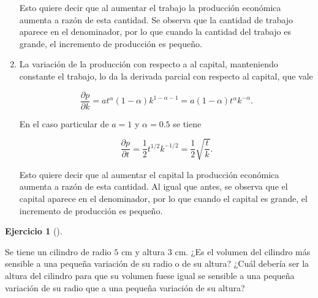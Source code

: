 \documentclass[
  a4paper,
]{scrreport}
\theoremstyle{definition}
\newtheorem{exercise}{Ejercicio}[chapter]
\theoremstyle{remark}
\begin{document}
\begin{tcolorbox}
\begin{enumerate}
  Esto quiere decir que al aumentar el trabajo la producción económica
  aumenta a razón de esta cantidad. Se observa que la cantidad de
  trabajo aparece en el denominador, por lo que cuando la cantidad del
  trabajo es grande, el incremento de producción es pequeño.
\item
  La variación de la producción con respecto a al capital, manteniendo
  constante el trabajo, lo da la derivada parcial con respecto al
  capital, que vale

  \[
  \frac{\partial p}{\partial k} = at^{\alpha}(1-\alpha)k^{1-\alpha-1} = a(1-\alpha)t^{\alpha}k^{-\alpha}.
  \]

  En el caso particular de \(a=1\) y \(\alpha=0.5\) se tiene

  \[
  \frac{\partial p}{\partial t} = \frac{1}{2}t^{1/2}k^{-1/2} = \frac{1}{2}\sqrt{\frac{t}{k}}.
  \]

  Esto quiere decir que al aumentar el capital la producción económica
  aumenta a razón de esta cantidad. Al igual que antes, se observa que
  el capital aparece en el denominador, por lo que cuando el capital es
  grande, el incremento de producción es pequeño.
\end{enumerate}

\end{tcolorbox}

\begin{exercise}[]\protect\hypertarget{exr-variacion-volumen-cilindro}{}\label{exr-variacion-volumen-cilindro}

Se tiene un cilindro de radio \(5\) cm y altura \(3\) cm. ¿Es el volumen
del cilindro más sensible a una pequeña variación de su radio o de su
altura? ¿Cuál debería ser la altura del cilindro para que su volumen
fuese igual se sensible a una pequeña variación de su radio que a una
pequeña variación de su altura?

\end{exercise}
\end{document}

